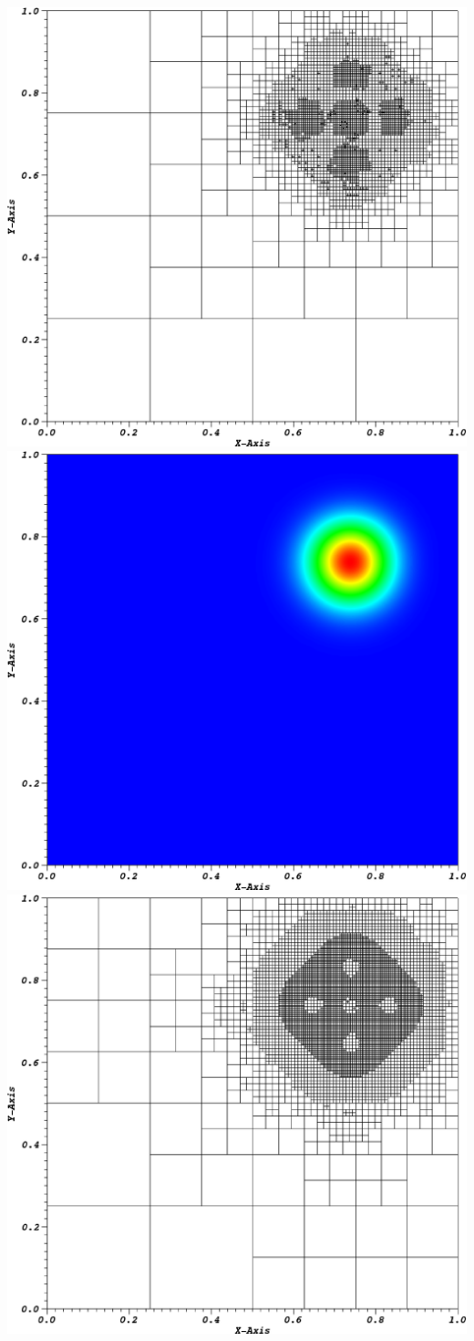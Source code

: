 \documentclass[compress,10pt]{beamer}
\begin{document}
\begin{frame}[t]
{\begin{columns}
{}\includegraphics[width=0.70\columnwidth]{images/ME1_cart_Irr=1_tol=0.2_cyc15_mesh.eps} \\
{}\includegraphics[width=0.70\columnwidth]{images/ME1_cart_Irr=1_tol=0.2_cyc15_sol.eps}
\centering
{}\includegraphics[width=0.70\columnwidth]{images/ME2_cart_Irr=1_tol=0.1_cyc08_mesh.eps} \\

\end{columns}}
\end{frame}
\end{document}

